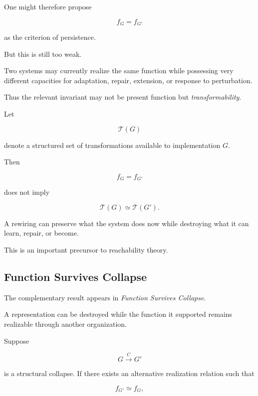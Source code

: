 \documentclass[11pt]{article}
\theoremstyle{remark}
\begin{document}
One might therefore propose

\begin{equation}
f_G=f_{G'}
\end{equation}

as the criterion of persistence.

But this is still too weak.

Two systems may currently realize the same function while possessing very different capacities for adaptation, repair, extension, or response to perturbation.

Thus the relevant invariant may not be present function but \emph{transformability}.

Let

\begin{equation}
\mathcal{T}(G)
\end{equation}

denote a structured set of transformations available to implementation $G$.

Then

\begin{equation}
f_G=f_{G'}
\end{equation}

does not imply

\begin{equation}
\mathcal{T}(G)\simeq\mathcal{T}(G').
\end{equation}

A rewiring can preserve what the system does now while destroying what it can learn, repair, or become.

This is an important precursor to reachability theory.

\subsection{Function Survives Collapse}

The complementary result appears in \emph{Function Survives Collapse}.

A representation can be destroyed while the function it supported remains realizable through another organization.

Suppose

\begin{equation}
G
\xrightarrow{C}
G'
\end{equation}

is a structural collapse. If there exists an alternative realization relation such that

\begin{equation}
f_{G'}
\simeq f_G,
\end{equation}
\end{document}
